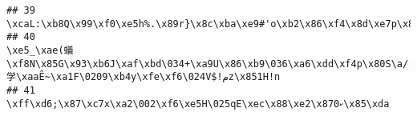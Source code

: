 \documentclass[
]{article}
\begin{document}
\begin{verbatim}
## 39                                                                                                                                                                                                                                                                                                                                                                                                                                                                                                                                                                                                                                                                                                                                                          \xcaL:\xb8Q\x99\xf0\xe5h%.\x89r}\x8c\xba\xe9#'o\xb2\x86\xf4\x8d\xe7p\x854\xdexh\xff\x91\xf8[\xb1S\036\x90\033Bp\031M&\005+)\004\x9f<\x85\x9f\021k
## 40                                                                                                                                                                                                                                                                                                                                       \xe5_\xae(蟻\xf8N\x85G\x93\xb6J\xaf\xbd\034+\xa9U\x86\xb9\036\xa6\xdd\xf4p\x80S\a/:@\xfdr\x94T\xad}s\035uL\xdeuF\035TT'~9\032\xaa\xd6\xf6\xb9\x86:\xa6\xed:\xa3\016\032\xaa\023\xbf\x9c4]\xec]2\xed\x8cZ\xe4\xe9*aS\x80)\xbf\xf7\xa2\x83r\\#\xb6\xea\xa2Z\xe14\xca\xff]\xd4\177\xbd\x8b\xaa\xe3.y\x88\031\x9fNT1\xb9q\x9b\xa8M*wE\x87\x9878\xd0\001p.y$\033X\x80H2\x9cn\017\x9f\xe4\xfc\xa0\xd0%I\xc8\xe8\026Z|'ǡ\x8f\x82\x84\xf2\xfd\033h\x96+\x80\n\xcc\026\xf6)\xb8\027\xfa\033\032B#i\035\x83\017\x8b(G\xbd\xf9Z学\xaaȆ~\xa1F\0209\xb4y\xfe\xf6\024V$!مz\x851H!n
## 41                                                                                                                                                                                                                                                                                                                                                                                                                                                                                                                                                                                                                                                                                                                                                                                                                                        \xff\xd6;\x87\xc7x\xa2\002\xf6\xe5H\025qE\xec\x88\xe2\x87ކ0\x85\xda

\end{verbatim}
\end{document}
